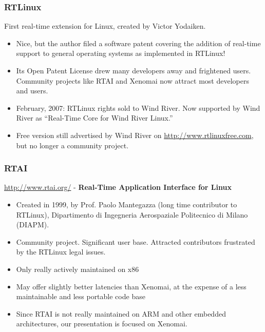\begin{frame}
  \frametitle{RTLinux}
  First real-time extension for Linux, created by Victor Yodaiken.
  \begin{itemize}
  \item Nice, but the author filed a software patent covering the
    addition of real-time support to general operating systems as
    implemented in RTLinux!
  \item Its Open Patent License drew many developers away and
    frightened users.  Community projects like RTAI and Xenomai now
    attract most developers and users.
  \item February, 2007: RTLinux rights sold to Wind River. Now
    supported by Wind River as “Real-Time Core for Wind River Linux.”
  \item Free version still advertised by Wind River on
    \url{http://www.rtlinuxfree.com}, but no longer a community
    project.
  \end{itemize}
\end{frame}

\begin{frame}
  \frametitle{RTAI}
  \url{http://www.rtai.org/} - {\bf Real-Time Application Interface for Linux}
  \begin{itemize}
  \item Created in 1999, by Prof. Paolo Mantegazza (long time
    contributor to RTLinux), Dipartimento di Ingegneria Aerospaziale
    Politecnico di Milano (DIAPM).
  \item Community project. Significant user base. Attracted
    contributors frustrated by the RTLinux legal issues.
  \item Only really actively maintained on x86
  \item May offer slightly better latencies than Xenomai, at the
    expense of a less maintainable and less portable code base
  \item Since RTAI is not really maintained on ARM and other embedded
    architectures, our presentation is focused on Xenomai.
  \end{itemize}
\end{frame}

